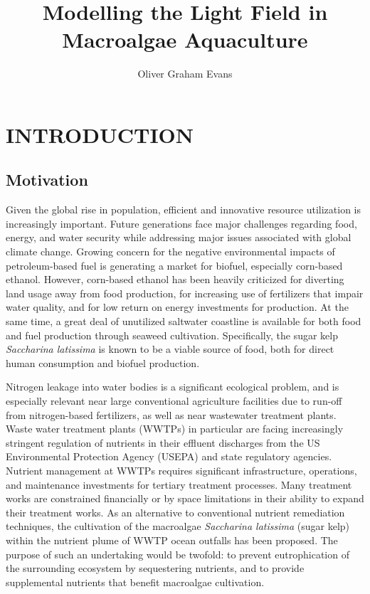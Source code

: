 \documentclass[ms,cpyr,lof,lot]{uathesis}
\title{Modelling the Light Field in Macroalgae Aquaculture}
\author{Oliver Graham Evans}
\begin{document}
\maketitle
\chapter{INTRODUCTION} \label{ch:intro}

\section{Motivation}
  Given the global rise in population, efficient and innovative resource utilization is increasingly important.
Future generations face major challenges regarding food, energy, and water security while addressing major issues associated with global climate change.
Growing concern for the negative environmental impacts of petroleum-based fuel is generating a market for biofuel, especially corn-based ethanol.
However, corn-based ethanol has been heavily criticized for diverting land usage away from food production, for increasing use of fertilizers that impair water quality, and for low return on energy investments for production.
At the same time, a great deal of unutilized saltwater coastline is available for both food and fuel production through seaweed cultivation.
Specifically, the sugar kelp \textit{Saccharina latissima} is known to be a viable source of food,  both for direct human consumption and biofuel production.

Nitrogen leakage into water bodies is a significant ecological problem, and is especially relevant near large conventional agriculture facilities due to run-off from nitrogen-based fertilizers, as well as near wastewater treatment plants.
Waste water treatment plants (WWTPs) in particular are facing increasingly stringent regulation of nutrients in their effluent discharges from the US Environmental Protection Agency (USEPA) and state regulatory agencies.
Nutrient management at WWTPs requires significant infrastructure, operations, and maintenance investments for tertiary treatment processes. Many treatment works are constrained financially or by space limitations in their ability to expand their treatment works.
As an alternative to conventional nutrient remediation techniques, the cultivation of the macroalgae \textit{Saccharina latissima} (sugar kelp) within the nutrient plume of WWTP ocean outfalls has been proposed.
The purpose of such an undertaking would be twofold: to prevent eutrophication of the surrounding ecosystem by sequestering nutrients, and to provide supplemental nutrients that benefit macroalgae cultivation. 
\end{document}
